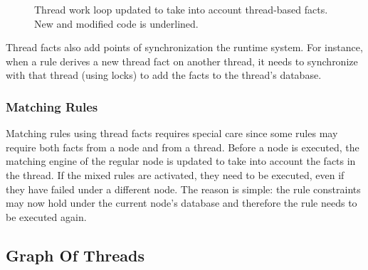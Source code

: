 \begin{figure}
\begin{algorithm}[H]
\end{algorithm}
\caption{Thread work loop updated to take into account thread-based facts.
New and modified code is underlined.}
\label{alg:threads:work_loop}
\end{figure}

Thread facts also add points of synchronization the runtime system. For
instance, when a rule derives a new thread fact on another thread, it needs to
synchronize with that thread (using locks) to add the facts to the thread's
database.

\subsubsection{Matching Rules}

Matching rules using thread facts requires special care since some rules may
require both facts from a node and from a thread. Before a node is executed, the
matching engine of the regular node is updated to take into account the facts in
the thread. If the mixed rules are activated, they need to be executed, even if
they have failed under a different node. The reason is simple: the rule
constraints may now hold under the current node's database and therefore the
rule needs to be executed again.

\subsection{Graph Of Threads}

